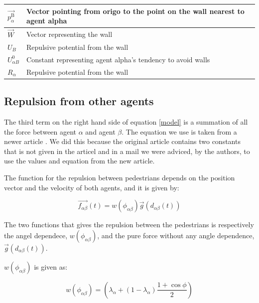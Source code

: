 \begin{center}
\begin{tabular}{lll}
\hline
$\overrightarrow{p_{\alpha}^{\text{B}}}$& Vector pointing from origo to the point on the wall nearest to agent alpha &\\
\hline
$\overrightarrow{W}$& Vector representing the wall &\\
\hline
$U_{B}$ & Repulsive potential from the wall\\
\hline
$U^{0}_{\alpha B}$ & Constant representing agent alpha's tendency to avoid walls\\
\hline
$R_{\alpha}$& Repulsive potential from the wall\\
\hline
\end{tabular}
\end{center}

\subsection{Repulsion from other agents}
The third term on the right hand side of equation \eqref{model} is a summation of all the 
force between agent $\alpha$ and agent $\beta$. The equation we use is taken from a newer article \cite{ABconstant}. We did this because the original article contains two constants that is not given in the articel and in a mail we were adviced, by the authors, to use the values and equation from the new article. 

The function for the repulsion between pedestrians depends on the position vector and the velocity of 
both agents, and it is given by:

\begin{equation}
        \overrightarrow{f_{\alpha \beta }}\left( t \right) = w\left(\phi_{\alpha \beta}\right)\overrightarrow{g}\left(d_{\alpha \beta}(t)\right)
    \label{eq:agentinteraction}
\end{equation}

The two functions that gives the repulsion between the pedestrians is respectively the angel dependece, $ w\left(\phi_{\alpha \beta}\right)$, and the pure force without any angle dependence, $\overrightarrow{g}\left(d_{\alpha \beta}(t)\right)$.

$ w\left(\phi_{\alpha \beta}\right)$ is given as: 

\begin{equation}
    w\left(\phi_{\alpha \beta}\right)=
    \left(
        \lambda_{\alpha} + \left(
            1 - \lambda_{\alpha}
        \right)
		\frac{1+\cos{\phi}}{2}
    \right) 
    \label{angleAB}
\end{equation}

